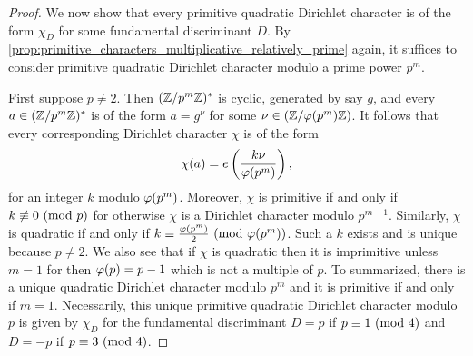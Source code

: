 \begin{proof}
      We now show that every primitive quadratic Dirichlet character is of the form \(\chi_{D}\) for some fundamental discriminant \(D\). By \cref{prop:primitive_characters_multiplicative_relatively_prime} again, it suffices to consider primitive quadratic Dirichlet character modulo a prime power \(p^{m}\).
      
      First suppose \(p \neq 2\). Then \((\mathbb{Z}/p^{m}\mathbb{Z})^{\ast}\) is cyclic, generated by say \(g\), and every \(a \in (\mathbb{Z}/p^{m}\mathbb{Z})^{\ast}\) is of the form \(a = g^{\nu}\) for some \(\nu \in (\mathbb{Z}/\varphi(p^{m})\mathbb{Z})\). It follows that every corresponding Dirichlet character \(\chi\) is of the form
      \[
        \chi(a) = e\left(\frac{k\nu}{\varphi(p^{m})}\right),
      \]
      for an integer \(k\) modulo \(\varphi(p^{m})\). Moreover, \(\chi\) is primitive if and only if \(k \not\equiv 0 \ (\mathrm{mod}\text{ }p)\) for otherwise \(\chi\) is a Dirichlet character modulo \(p^{m-1}\). Similarly, \(\chi\) is quadratic if and only if \(k \equiv \frac{\varphi(p^{m})}{2} \ (\mathrm{mod}\text{ }\varphi(p^{m}))\). Such a \(k\) exists and is unique because \(p \neq 2\). We also see that if \(\chi\) is quadratic then it is imprimitive unless \(m = 1\) for then \(\varphi(p) = p-1\) which is not a multiple of \(p\). To summarized, there is a unique quadratic Dirichlet character modulo \(p^{m}\) and it is primitive if and only if \(m = 1\). Necessarily, this unique primitive quadratic Dirichlet character modulo \(p\) is given by \(\chi_{D}\) for the fundamental discriminant \(D = p\) if \(p \equiv 1 \ (\mathrm{mod}\text{ }4)\) and \(D = -p\) if \(p \equiv 3 \ (\mathrm{mod}\text{ }4)\).
      

\end{proof}
